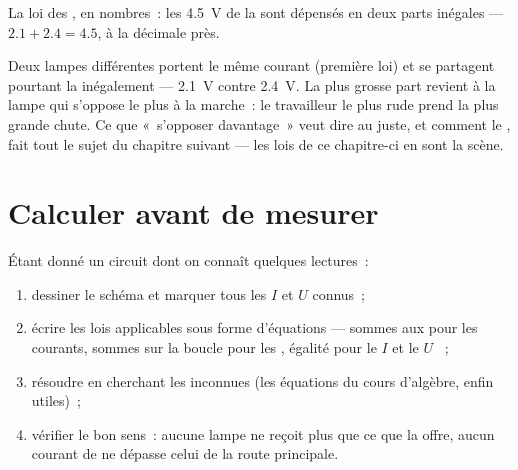 \begin{omfigure}

{\small La loi des  , en nombres~: les \qty{4.5}{V}
de la  sont dépensés en deux parts inégales --- $2.1 + 2.4 =
4.5$, à la décimale près.}
\end{omfigure}

\begin{example}\label{ex:g8:circuit-laws:unequal}
Deux lampes différentes  portent le même courant (première
loi) et se partagent pourtant la  inégalement --- \qty{2.1}{V}
contre \qty{2.4}{V}. La plus grosse part revient à la lampe qui
s'oppose le plus à la marche~: le travailleur le plus rude prend la
plus grande chute. Ce que «~s'opposer davantage~» veut dire au juste,
et comment le , fait tout le sujet du chapitre suivant --- les
lois de ce chapitre-ci en sont la scène.
\end{example}

\section{Calculer avant de mesurer}

\begin{method}\label{met:g8:circuit-laws:solve}
Étant donné un circuit dont on connaît quelques lectures~:
\begin{enumerate}
  \item dessiner le schéma et marquer tous les $I$ et $U$ connus~;
  \item écrire les lois applicables sous forme d'équations ---
        sommes aux  pour les courants, sommes sur la boucle
        pour les , égalité pour le $I$  et le $U$
        ~;
  \item résoudre en cherchant les inconnues (les équations du cours
        d'algèbre, enfin utiles)~;
  \item vérifier le bon sens~: aucune lampe ne reçoit plus que ce
        que la  offre, aucun courant de  ne dépasse
        celui de la route principale.
\end{enumerate}
\end{method}

